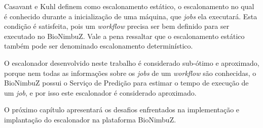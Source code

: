 Casavant e Kuhl \cite{4634_TaxonomiaEscalonador} definem como escalonamento estático, o escalonamento no qual é conhecido durante a inicialização de uma máquina, que \textit{jobs} ela executará. Esta condição é satisfeita, pois um \textit{workflow} precisa ser bem definido para ser executado no BioNimbuZ. Vale a pena ressaltar que o escalonamento estático também pode ser denominado escalonamento determinístico.

O escalonador desenvolvido neste trabalho é considerado sub-ótimo e aproximado, porque nem todas as informações sobre os \textit{jobs} de um \textit{workflow} são conhecidas, o BioNimbuZ possui o Serviço de Predição para estimar o tempo de execução de um \textit{job}, e por isso este escalonador é considerado aproximado.


O próximo capítulo apresentará os desafios enfrentados na implementação e implantação do escalonador na plataforma BioNimbuZ.





